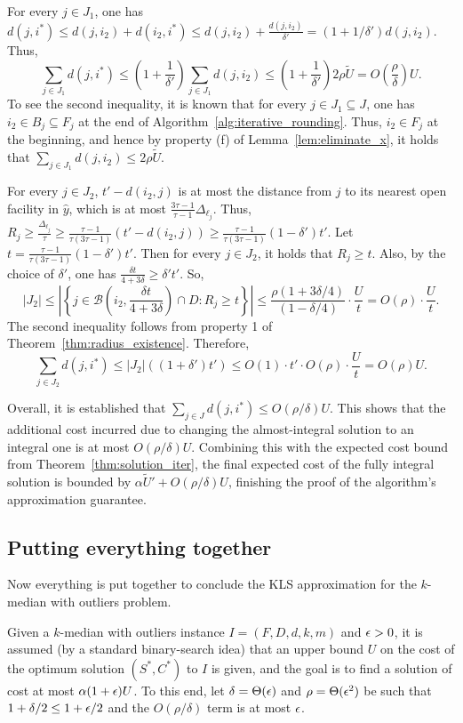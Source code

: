 For every $j \in J_1$, one has $d(j, i^*) \le d(j, i_2) + d(i_2, i^*) \le d(j, i_2) + \frac{d(j, i_2)}{\delta'} = (1 + 1/\delta')d(j, i_2)$. Thus,
\[ \sum_{j \in J_1} d(j, i^*) \le \left(1 + \frac{1}{\delta'}\right) \sum_{j \in J_1} d(j, i_2) \le \left(1 + \frac{1}{\delta'}\right) 2\rho\tilde{U} = O\left(\frac{\rho}{\delta}\right) U. \]
To see the second inequality, it is known that for every $j \in J_1 \subseteq J$, one has $i_2 \in B_j \subseteq F_j$ at the end of Algorithm~\ref{alg:iterative_rounding}. Thus, $i_2 \in F_j$ at the beginning, and hence by property (f) of Lemma~\ref{lem:eliminate_x}, it holds that $\sum_{j \in J_1} d(j, i_2) \le 2\rho\tilde{U}$.

For every $j \in J_2$, $t' - d(i_2, j)$ is at most the distance from $j$ to its nearest open facility in $\hat{y}$, which is at most $\frac{3\tau-1}{\tau-1}\Delta_{\ell_j}$. Thus, $R_j \ge \frac{\Delta_{\ell_j}}{\tau} \ge \frac{\tau-1}{\tau(3\tau-1)}(t' - d(i_2, j)) \ge \frac{\tau-1}{\tau(3\tau-1)}(1 - \delta')t'$. Let $t = \frac{\tau-1}{\tau(3\tau-1)}(1 - \delta')t'$. Then for every $j \in J_2$, it holds that $R_j \ge t$. Also, by the choice of $\delta'$, one has $\frac{\delta t}{4+3\delta} \ge \delta' t'$. So,
\[ |J_2| \le \left| \left\{ j \in \mathcal{B} \left(i_2, \frac{\delta t}{4+3\delta} \right) \cap D : R_j \ge t \right\} \right| \le \frac{\rho(1+3\delta/4)}{(1-\delta/4)} \cdot \frac{U}{t} = O(\rho) \cdot \frac{U}{t}. \]
The second inequality follows from property 1 of Theorem~\ref{thm:radius_existence}. Therefore,
\[ \sum_{j \in J_2} d(j, i^*) \le |J_2|((1+\delta')t') \le O(1) \cdot t' \cdot O(\rho) \cdot \frac{U}{t} = O(\rho)U. \]

Overall, it is established that $\sum_{j \in J} d(j, i^*) \le O(\rho/\delta)U$. This shows that the additional cost incurred due to changing the almost-integral solution to an integral one is at most $O(\rho/\delta)U$. Combining this with the expected cost bound from Theorem~\ref{thm:solution_iter}, the final expected cost of the fully integral solution is bounded by $\alpha \tilde{U}' + O(\rho/\delta)U$, finishing the proof of the algorithm's approximation guarantee.

\subsection{Putting everything together}
Now everything is put together to conclude the KLS approximation for the $k$-median with outliers problem.

Given a $k$-median with outliers instance $I = (F, D, d, k, m)$ and $\epsilon > 0$, it is assumed (by a standard binary-search idea) that an upper bound $U$ on the cost of the optimum solution $(S^*, C^*)$ to $I$ is given, and the goal is to find a solution of cost at most $\alpha(1+\epsilon)U$. To this end, let $\delta = \Theta(\epsilon)$ and $\rho = \Theta(\epsilon^2)$ be such that $1+\delta/2 \le 1+\epsilon/2$ and the $O(\rho/\delta)$ term is at most $\epsilon$.


